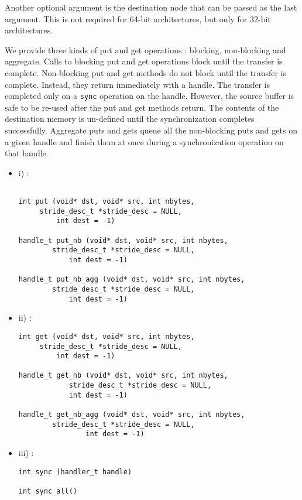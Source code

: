Another optional argument is  the
destination node that can be passed as the last argument. This is not required for 64-bit 
architectures, but only for 32-bit architectures.

We provide three kinds of put and get operations : blocking, non-blocking and aggregate.
Calls to blocking put and get operations block until the transfer is complete. 
Non-blocking put and get methods do not block until the transfer is complete. Instead,
they return immediately with a handle. The transfer is completed only on a {\tt sync} operation
on the handle. However, the source buffer is safe to be re-used after the put and get methods return. 
The contents of the destination memory is un-defined until the synchronization completes successfully.
Aggregate puts and gets queue all the non-blocking puts and gets on a given handle and finish
them at once during a synchronization operation on that handle. 

\begin{itemize}

\item i) : 

\begin{verbatim}

int put (void* dst, void* src, int nbytes, 
	 stride_desc_t *stride_desc = NULL,
         int dest = -1)

handle_t put_nb (void* dst, void* src, int nbytes, 
	    stride_desc_t *stride_desc = NULL,
            int dest = -1)

handle_t put_nb_agg (void* dst, void* src, int nbytes, 
	    stride_desc_t *stride_desc = NULL,
            int dest = -1)
\end{verbatim}

\item ii) : 

\begin{verbatim}
int get (void* dst, void* src, int nbytes,
	 stride_desc_t *stride_desc = NULL,
    	 int dest = -1)

handle_t get_nb (void* dst, void* src, int nbytes,
        	stride_desc_t *stride_desc = NULL,
    	 	int dest = -1)

handle_t get_nb_agg (void* dst, void* src, int nbytes, 
		stride_desc_t *stride_desc = NULL,
            	int dest = -1)
\end{verbatim}

\item iii) :

\begin{verbatim}
int sync (handler_t handle)

int sync_all()
\end{verbatim}

\end {itemize}

